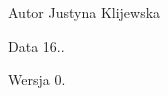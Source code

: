 \begin{DoxyAuthor}{Autor}
Justyna Klijewska 
\end{DoxyAuthor}
\begin{DoxyDate}{Data}
16.. 
\end{DoxyDate}
\begin{DoxyVersion}{Wersja}
0. 
\end{DoxyVersion}
